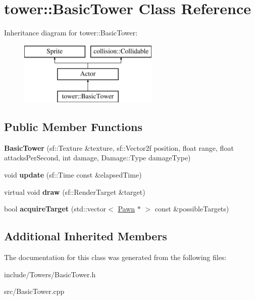 \hypertarget{classtower_1_1_basic_tower}{}\section{tower\+:\+:Basic\+Tower Class Reference}
\label{classtower_1_1_basic_tower}
Inheritance diagram for tower\+:\+:Basic\+Tower\+:\begin{figure}[H]
\begin{center}
\leavevmode
\includegraphics[height=3.000000cm]{classtower_1_1_basic_tower}
\end{center}
\end{figure}
\subsection*{Public Member Functions}
\begin{DoxyCompactItemize}
\item 
\hypertarget{classtower_1_1_basic_tower_ad47cda8c34a98257c5cbd0ba9dfab163}{}{\bfseries Basic\+Tower} (sf\+::\+Texture \&texture, sf\+::\+Vector2f position, float range, float attacks\+Per\+Second, int damage, Damage\+::\+Type damage\+Type)\label{classtower_1_1_basic_tower_ad47cda8c34a98257c5cbd0ba9dfab163}

\item 
\hypertarget{classtower_1_1_basic_tower_aa8363905f0305f60ffba028c393e6098}{}void {\bfseries update} (sf\+::\+Time const \&elapsed\+Time)\label{classtower_1_1_basic_tower_aa8363905f0305f60ffba028c393e6098}

\item 
\hypertarget{classtower_1_1_basic_tower_a180cb7c32e45fed8e4d4476fd6e2d7ce}{}virtual void {\bfseries draw} (sf\+::\+Render\+Target \&target)\label{classtower_1_1_basic_tower_a180cb7c32e45fed8e4d4476fd6e2d7ce}

\item 
\hypertarget{classtower_1_1_basic_tower_a80cb558b7d52b02708e4661b486311b6}{}bool {\bfseries acquire\+Target} (std\+::vector$<$ \hyperlink{class_pawn}{Pawn} $\ast$ $>$ const \&possible\+Targets)\label{classtower_1_1_basic_tower_a80cb558b7d52b02708e4661b486311b6}

\end{DoxyCompactItemize}
\subsection*{Additional Inherited Members}


The documentation for this class was generated from the following files\+:\begin{DoxyCompactItemize}
\item 
include/\+Towers/Basic\+Tower.\+h\item 
src/Basic\+Tower.\+cpp\end{DoxyCompactItemize}
